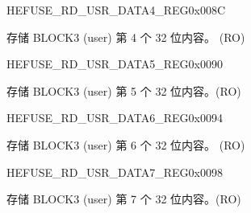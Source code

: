 \begin{register}{H}{EFUSE\_RD\_USR\_DATA4\_REG}{0x008C}\label{regdesc:EFUSERDUSRDATA4REG}
%
\regnewline%
\begin{regdesc}\begin{reglist}
\label{fielddesc:EFUSEUSRDATA4}\item [EFUSE\_USR\_DATA4] 存储 BLOCK3 (user) 第 4 个 32 位内容。 (RO)
\end{reglist}\end{regdesc}
\end{register}


\begin{register}{H}{EFUSE\_RD\_USR\_DATA5\_REG}{0x0090}\label{regdesc:EFUSERDUSRDATA5REG}
%
\regnewline%
\begin{regdesc}\begin{reglist}
\label{fielddesc:EFUSEUSRDATA5}\item [EFUSE\_USR\_DATA5] 存储 BLOCK3 (user) 第 5 个 32 位内容。(RO)
\end{reglist}\end{regdesc}
\end{register}


\begin{register}{H}{EFUSE\_RD\_USR\_DATA6\_REG}{0x0094}\label{regdesc:EFUSERDUSRDATA6REG}
%
\regnewline%
\begin{regdesc}\begin{reglist}
\label{fielddesc:EFUSEUSRDATA6}\item [EFUSE\_USR\_DATA6] 存储 BLOCK3 (user) 第 6 个 32 位内容。 (RO)
\end{reglist}\end{regdesc}
\end{register}


\begin{register}{H}{EFUSE\_RD\_USR\_DATA7\_REG}{0x0098}\label{regdesc:EFUSERDUSRDATA7REG}
%
\regnewline%
\begin{regdesc}\begin{reglist}
\label{fielddesc:EFUSEUSRDATA7}\item [EFUSE\_USR\_DATA7] 存储 BLOCK3 (user) 第 7 个 32 位内容。(RO)
\end{reglist}\end{regdesc}
\end{register}


